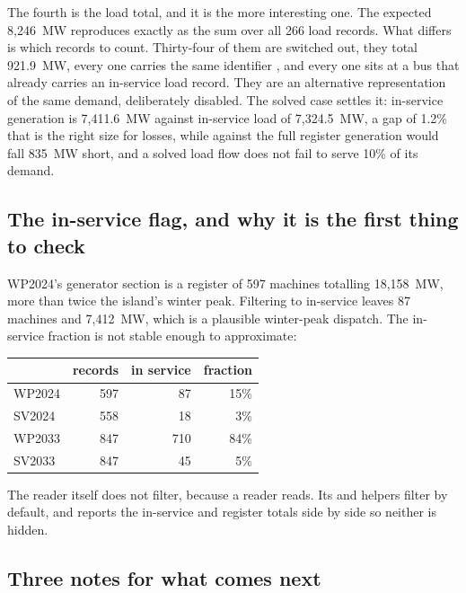 \documentclass[11pt,a4paper]{article}
\begin{document}
The fourth is the load total, and it is the more interesting one. The expected
8{,}246~MW reproduces exactly as the sum over all 266 load records. What
differs is which records to count. Thirty-four of them are switched out, they
total 921.9~MW, every one carries the same identifier , and every one
sits at a bus that already carries an in-service load record. They are an
alternative representation of the same demand, deliberately disabled. The
solved case settles it: in-service generation is 7{,}411.6~MW against
in-service load of 7{,}324.5~MW, a gap of 1.2\% that is the right size for
losses, while against the full register generation would fall 835~MW short, and
a solved load flow does not fail to serve 10\% of its demand.

\subsection{The in-service flag, and why it is the first thing to check}

WP2024's generator section is a register of 597 machines totalling 18{,}158~MW,
more than twice the island's winter peak. Filtering to in-service leaves 87
machines and 7{,}412~MW, which is a plausible winter-peak dispatch. The
in-service fraction is not stable enough to approximate:

\begin{table}[H]\centering\small
\begin{tabular}{lrrr}
\toprule
& \textbf{records} & \textbf{in service} & \textbf{fraction} \\
\midrule
WP2024 & 597 & 87  & 15\% \\
SV2024 & 558 & 18  & 3\% \\
WP2033 & 847 & 710 & 84\% \\
SV2033 & 847 & 45  & 5\% \\
\bottomrule
\end{tabular}
\end{table}

The reader itself does not filter, because a reader reads. Its
 and  helpers filter by default, and
 reports the in-service and register totals side by side so
neither is hidden.


\subsection{Three notes for what comes next}
\end{document}
